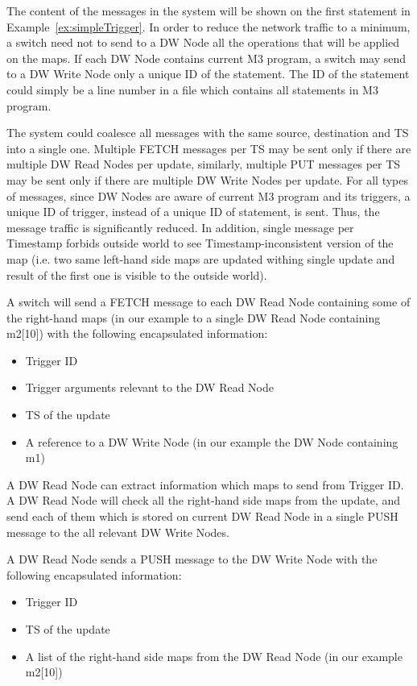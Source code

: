 \documentclass{sig-semester}
\def\M3{M3\xspace}
\begin{document}
The content of the messages in the system will be shown on the first statement in Example~\ref{ex:simpleTrigger}. In order to reduce the network traffic to a minimum, a switch need not to send to a DW Node all the operations that will be applied on the maps. If each DW Node contains current \M3 program, a switch may send to a DW Write Node only a unique ID of the statement. The ID of the statement could simply be a line number in a file which contains all statements in \M3 program.

The system could coalesce all messages with the same source, destination and TS into a single one. Multiple FETCH messages per TS may be sent only if there are multiple DW Read Nodes per update, similarly, multiple PUT messages per TS may be sent only if there are multiple DW Write Nodes per update. For all types of messages, since DW Nodes are aware of current \M3 program and its triggers, a unique ID of trigger, instead of a unique ID of statement, is sent. Thus, the message traffic is significantly reduced. In addition, single message per Timestamp forbids outside world to see Timestamp-inconsistent version of the map (i.e. two same left-hand side maps are updated withing single update and result of the first one is visible to the outside world).

A switch will send a FETCH message to each DW Read Node containing some of the right-hand maps (in our example to a single DW Read Node containing m2[10]) with the following encapsulated information:
\begin{itemize}
 \item Trigger ID
 \item Trigger arguments relevant to the DW Read Node
 \item TS of the update
 \item A reference to a DW Write Node (in our example the DW Node containing m1)
\end{itemize}

A DW Read Node can extract information which maps to send from Trigger ID. A DW Read Node will check all the right-hand side maps from the update, and send each of them which is stored on current DW Read Node in a single PUSH message to the all relevant DW Write Nodes.

A DW Read Node sends a PUSH message to the DW Write Node with the following encapsulated information:
\begin{itemize}
 \item Trigger ID
 \item TS of the update
 \item A list of the right-hand side maps from the DW Read Node (in our example m2[10])
\end{itemize}
\end{document}
